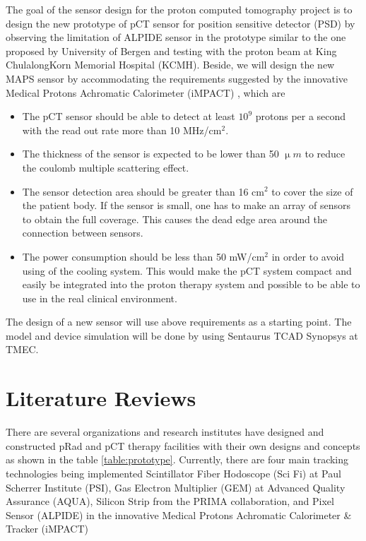 \documentclass[12pt,a4paper]{article}
\begin{document}
The goal of the sensor design for the proton computed tomography project is to design the new prototype of pCT sensor for position sensitive detector (PSD) by observing the limitation of ALPIDE sensor in the prototype similar to the one proposed by University of Bergen and testing with the proton beam at King ChulalongKorn Memorial Hospital (KCMH).   Beside, we will design the new MAPS sensor by accommodating the requirements suggested by the innovative Medical Protons Achromatic Calorimeter (iMPACT) \cite{MATTIAZZO2017664} , which are 
\begin{itemize}
\item The pCT sensor should be able to detect at least  $10^9$ protons per a second with the read out rate more than 10 MHz/cm$^{2}$.  
\item The thickness of the sensor is expected to be lower than 50 $\upmu m$ to reduce the coulomb multiple scattering effect.
\item The sensor detection area should be greater than 16 cm$^2$ to cover the size of the patient body. If the sensor is small, one has to make an array of sensors to obtain the full coverage. This causes  the dead edge area around the connection between sensors.
\item The power consumption should be less  than 50 mW/cm$^2$ in order to avoid using of the cooling system. This would make the pCT system compact  and easily be integrated into the proton therapy system and possible to be able to use in the real clinical environment.
\end{itemize}
The design of  a new sensor will use above requirements as a starting point. The model and device simulation will be done by  using Sentaurus TCAD  Synopsys  at TMEC.   
\section{Literature Reviews}

There are several  organizations and research institutes have designed and  constructed pRad and pCT therapy facilities with their own designs and concepts as shown in the table \ref{table:prototype}. Currently, there are four main  tracking technologies being implemented  Scintillator Fiber Hodoscope (Sci Fi) at Paul Scherrer Institute (PSI), Gas Electron Multiplier (GEM) at  Advanced Quality Assurance (AQUA), Silicon Strip from  the PRIMA collaboration, and Pixel Sensor (ALPIDE) in the innovative Medical Protons Achromatic Calorimeter \& Tracker (iMPACT)
\end{document}
